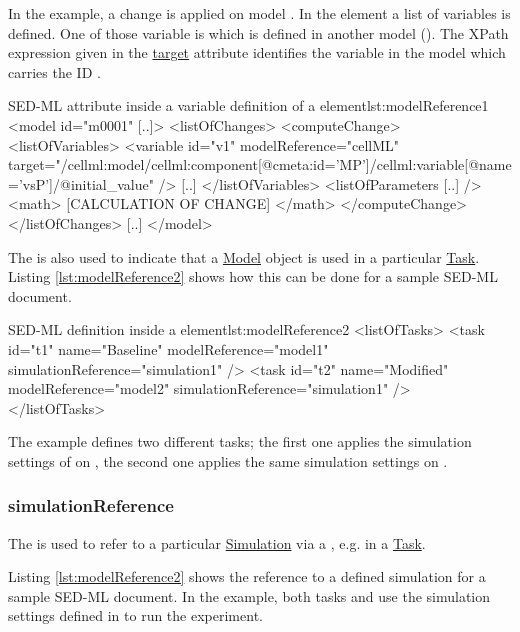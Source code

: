 In the example, a change is  applied on model . In the  element a list of variables is defined. One of those variable is  which is defined in another model (). The XPath expression given in the \hyperref[sec:target]{target} attribute identifies the variable in the model which carries the ID .
\begin{myXmlLst}{SED-ML  attribute inside a variable definition of a  element}{lst:modelReference1}
<model id="m0001" [..]>
	<listOfChanges>
		<computeChange>
			<listOfVariables>
				<variable id="v1" modelReference="cellML" target="/cellml:model/cellml:component[@cmeta:id='MP']/cellml:variable[@name='vsP']/@initial_value" />
     			[..]
			</listOfVariables>
			<listOfParameters [..] />
    			<math>
     			[CALCULATION OF CHANGE]
    			</math>
   		</computeChange>
	</listOfChanges>
	[..]
</model>
\end{myXmlLst}

The  is also used to indicate that a \hyperref[class:model]{Model} object is used in a particular  \hyperref[class:task]{Task}. Listing \ref{lst:modelReference2} shows how this can be done for a sample SED-ML document.

\begin{myXmlLst}{SED-ML  definition inside a  element}{lst:modelReference2}
<listOfTasks>
	<task id="t1" name="Baseline" modelReference="model1" simulationReference="simulation1" />
	<task id="t2" name="Modified" modelReference="model2" simulationReference="simulation1" />
</listOfTasks>
\end{myXmlLst}

The example defines two different tasks; the first one applies the simulation settings of  on , the second one applies the same simulation settings on .


\subsubsection{simulationReference}
\label{sec:simulationReference}
The  is used to refer to a particular \hyperref[class:simulation]{Simulation}  via a \hyperref[type:sidref]{}, e.g. in a \hyperref[class:task]{Task}. 

Listing \ref{lst:modelReference2} shows the reference to a defined simulation for a sample SED-ML document. In the example, both tasks  and  use the simulation settings defined in  to run the experiment.


